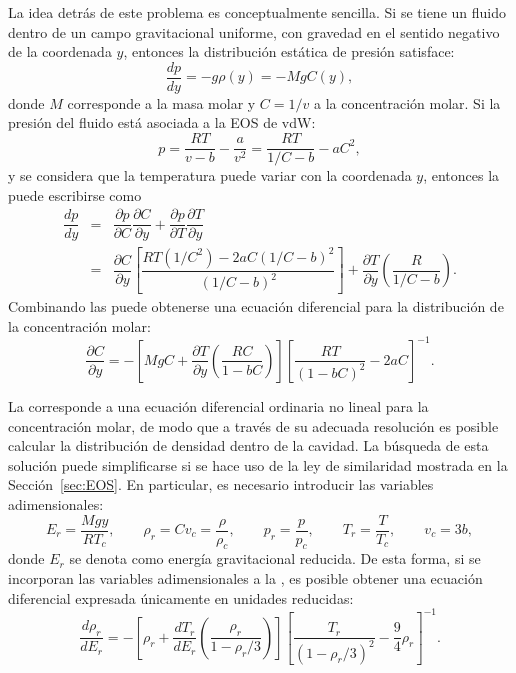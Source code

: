La idea detr\'as de este problema es conceptualmente sencilla. Si se tiene un fluido dentro de un campo gravitacional uniforme, con gravedad en el sentido negativo de la coordenada $y$, entonces la distribuci\'on est\'atica de presi\'on satisface:
\begin{equation}
	\dfrac{dp}{dy} = -g\rho(y) = -MgC(y),
	\label{eq:p_hidrost}
\end{equation}
donde $M$ corresponde a la masa molar y $C=1/v$ a la concentraci\'on molar. Si la presi\'on del fluido est\'a asociada a la EOS de vdW:
\begin{equation}
	p = \dfrac{RT}{v-b} - \dfrac{a}{v^2} = \dfrac{RT}{1/C-b} - aC^2,
\end{equation}
y se considera que la temperatura puede variar con la coordenada $y$, entonces la  puede escribirse como
\begin{equation}
	\begin{array}{rcl}
		\dfrac{dp}{dy} &=& \dfrac{\partial p }{\partial C} \dfrac{\partial C}{\partial y}	 + \dfrac{\partial p}{\partial T}\dfrac{\partial T}{\partial y} \\[3mm]
		&=& \dfrac{\partial C}{\partial y}\left[ \dfrac{RT(1/C^2)- 2aC(1/C-b)^2}{(1/C-b)^2} \right] + \dfrac{\partial T}{\partial y}\left( \dfrac{R}{1/C-b}\right).
	\end{array}
	\label{eq:partial_p}
\end{equation}
Combinando las  puede obtenerse una ecuaci\'on diferencial para la distribuci\'on de la concentraci\'on molar:
\begin{equation}
	\dfrac{\partial C}{\partial y} = -\left[ MgC + \dfrac{\partial T}{\partial y}\left( \dfrac{RC}{1-bC} \right) \right] \left[ \dfrac{RT}{(1-bC)^2} -2aC \right]^{-1}.
	\label{eq:vdw_molar}
\end{equation} 

La  corresponde a una ecuaci\'on diferencial ordinaria no lineal para la concentraci\'on molar, de modo que a trav\'es de su adecuada resoluci\'on es posible calcular la distribuci\'on de densidad dentro de la cavidad. 
La b\'usqueda de esta soluci\'on puede simplificarse si se hace uso de la ley de similaridad mostrada en la Secci\'on~\ref{sec:EOS}. En particular, es necesario introducir las variables adimensionales:
\begin{equation}
	E_r = \dfrac{Mgy}{RT_c}, \qquad \rho_r=Cv_c=\dfrac{\rho}{\rho_c}, \qquad p_r=\dfrac{p}{p_c}, \qquad T_r = \dfrac{T}{T_c}, \qquad v_c = 3b,
\end{equation}
donde $E_r$ se denota como energ\'ia gravitacional reducida. De esta forma, si se incorporan las variables adimensionales a la , es posible obtener una ecuaci\'on diferencial expresada \'unicamente en unidades reducidas:
\begin{equation}
	\dfrac{d\rho_r}{dE_r} = -\left[ \rho_r + \dfrac{dT_r}{dE_r} \left( \dfrac{\rho_r}{1-\rho_r/3} \right) \right]
\left[ \dfrac{T_r}{(1-\rho_r/3)^2} -\dfrac{9}{4}\rho_r \right]^{-1}.
	\label{eq:vdw_column_red}
\end{equation}

